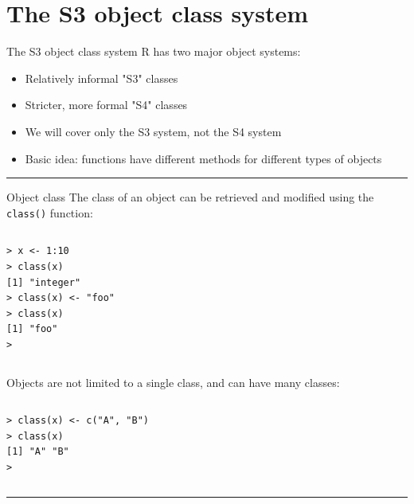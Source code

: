 \documentclass[table,smaller]{beamer}
\begin{document}
\section{The S3 object class system}
\label{sec-7}

\begin{frame}[label=sec-7-1]{The S3 object class system}
R has two major object systems: 
\begin{itemize}
\item Relatively informal "S3" classes
\item Stricter, more formal "S4" classes
\item We will cover only the S3 system, not the S4 system
\item Basic idea: functions have different methods for different types of objects
\end{itemize}

\rule{\linewidth}{0.5pt}
\end{frame}
\begin{frame}[fragile,label=sec-7-2]{Object class}
 The class of an object can be retrieved and modified using the \verb~class()~ function:

\vspace{-.5em}
\begin{columns}
\begin{block}{}
\begin{verbatim}
> x <- 1:10
> class(x) 
[1] "integer"
> class(x) <- "foo"
> class(x)
[1] "foo"
>
\end{verbatim}
\end{block}
\end{columns}
\vspace{.5em}

Objects are not limited to a single class, and can have many classes:

\vspace{-.5em}
\begin{columns}
\begin{block}{}
\begin{verbatim}
> class(x) <- c("A", "B")
> class(x) 
[1] "A" "B"
>
\end{verbatim}
\end{block}
\end{columns}
\vspace{.5em}

\rule{\linewidth}{0.5pt}
\end{frame}
\end{document}
